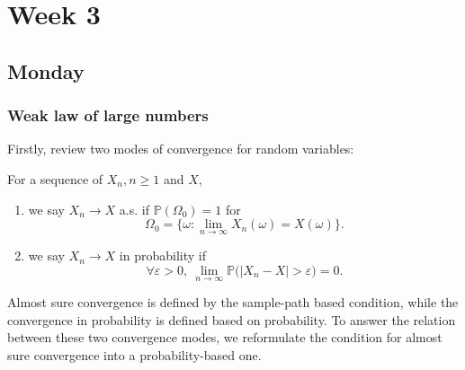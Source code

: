 
\chapter{Week 3}

\section{Monday}

\subsection{Weak law of large numbers}
Firstly, review two modes of convergence for random variables:
\begin{definition}
For a sequence of $X_n, n\ge1$ and $X$,
\begin{enumerate}
\item
we say $X_n\to X$ a.s. if $\mathbb{P}(\Omega_0)=1$ for 
\[
\Omega_0 = \{\omega: \lim_{n\to\infty}X_n(\omega)=X(\omega)\}.
\]
\item
we say $X_n\to X$ in probability if
\[
\forall\varepsilon>0,~\lim_{n\to\infty}\mathbb{P}\bigg(
|X_n-X|>\varepsilon
\bigg)=0.
\]
\end{enumerate}
\end{definition}
Almost sure convergence is defined by the sample-path based condition,
while the convergence in probability is defined based on probability.
To answer the relation between these two convergence modes,
we reformulate the condition for almost sure convergence into a probability-based one.

